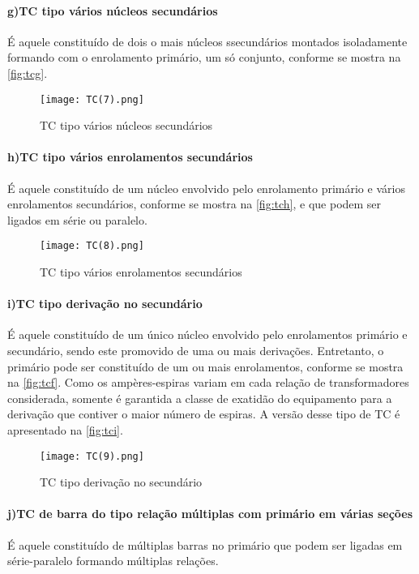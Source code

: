 				\paragraph*{g)\indent TC tipo vários núcleos secundários}
					É aquele constituído de dois o mais núcleos ssecundários montados isoladamente formando com o enrolamento primário, um só conjunto, conforme se mostra na \autoref{fig:tcg}.
					\begin{figure}[htb]
						\caption{TC tipo vários núcleos secundários}
						\centering
						\texttt{[image: TC(7).png]}
						\label{fig:tcg}
					\end{figure}
				\paragraph*{h)\indent TC tipo vários enrolamentos secundários}
					É aquele constituído de um núcleo envolvido pelo enrolamento primário e vários enrolamentos secundários, conforme se mostra na \autoref{fig:tch}, e que podem ser ligados em série ou paralelo.
					\begin{figure}[htb]
						\caption{TC tipo vários enrolamentos secundários}
						\centering
						\texttt{[image: TC(8).png]}
						\label{fig:tch}
					\end{figure}
				\paragraph*{i)\indent TC tipo derivação no secundário}
					É aquele constituído de um único núcleo envolvido pelo enrolamentos primário e secundário, sendo este promovido de uma ou mais derivações. Entretanto, o primário pode ser constituído de um ou mais enrolamentos, conforme se mostra na \autoref{fig:tcf}. Como os ampères-espiras variam em cada relação de transformadores considerada, somente é garantida a classe de  exatidão do equipamento para a derivação que contiver o maior número de espiras. A versão desse tipo de TC é apresentado na \autoref{fig:tci}.  
					\begin{figure}[htb]
						\caption{TC tipo derivação no secundário}
						\centering
						\texttt{[image: TC(9).png]}
						\label{fig:tci}
					\end{figure}
				\paragraph*{j)\indent TC de barra do tipo relação múltiplas com primário em várias seções}
					É aquele constituído de múltiplas barras no primário que podem ser ligadas em série-paralelo formando múltiplas relações.
			
